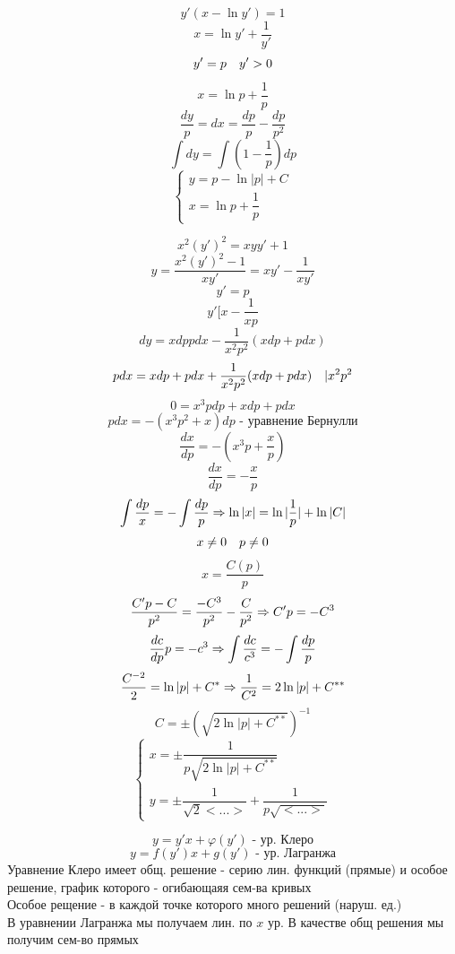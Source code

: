 \documentclass[12pt, fleqn]{article}
\begin{document}
\begin{Example}[267-286]
  \[y'(x-\ln y') = 1\]
  \[x = \ln y' + \dfrac{1}{y'}\]
  \[y' = p \quad y' > 0\]
  \[x = \ln p + \dfrac{1}{p}\]
  \[\dfrac{dy}{p} = dx = \dfrac{dp}{p} - \dfrac{dp}{p^2}\]
  \[\int dy = \int (1-\dfrac{1}{p}) dp\]
  \[\begin{cases}
    y = p - \ln |p| + C\\
    x = \ln p + \dfrac{1}{p}
  \end{cases}\]
\end{Example}

\begin{Example}[280]
  \[x^2 (y')^2 = xyy' + 1\]
  \[y = \dfrac{x^2 (y')^2 - 1}{x y'} = xy' - \dfrac{1}{xy'}\]
  \[y' = p\]
  \[y ' [x - \dfrac{1}{xp}\]
  \[dy = x dp p dx - \dfrac{1}{x^2 p^2} (x dp + p dx)\]
  \[p dx = x dp + p dx + \dfrac{1}{x^2 p^2} (x dp + p dx)\quad | x^2 p^2\]
  \[0 = x^3 p dp + x dp + p dx\]
  \[p dx = -(x^3 p^2 + x) dp \text{ - уравнение Бернулли}\]
  \[\dfrac{dx}{dp} = -(x^3 p + \dfrac{x}{p})\]
  \[\dfrac{dx}{dp} = - \dfrac{x}{p}\]
  \[\int \dfrac{dp}{x} = - \int \dfrac{dp}{p} \Rightarrow \ln |x| = \ln |\dfrac{1}{p}| + \ln|C|\]
  \[x \neq 0 \quad p \neq 0\]
  \[x = \dfrac{C(p)}{p}\]
  \[\dfrac{C'p - C}{p^2} = \dfrac{-C^3}{p^2} - \dfrac{C}{p^2} \Rightarrow C'p = - C^3\]
  \[\dfrac{dc}{dp} p = - c^3 \Rightarrow \int \dfrac{dc}{c^3} = - \int \dfrac{dp}{p}\]
  \[\dfrac{C^{-2}}{2} = \ln|p| + C^* \Rightarrow \dfrac{1}{C^2} = 2 \ln|p| + C^{**}\]
  \[C = \pm (\sqrt{2 \ln|p| + C^{**}})^{-1} \]
  \[\begin{cases}
    x = \pm \dfrac{1}{p\sqrt{2 \ln|p| + C^{**}}}\\
    y = \pm \dfrac{1}{\sqrt 2 <...>} + \dfrac{1}{p \sqrt{<...>}}
  \end{cases}\]
\end{Example}


\begin{Definition}
    \[y = y' x + \varphi(y') \text{ - ур. Клеро}\]
    \[y = f(y')x + g(y') \text{ - ур. Лагранжа}\]
    Уравнение Клеро имеет общ. решение - серию лин. функций (прямые) и особое решение, график которого - 
    огибающаяя сем-ва кривых\\
    Особое рещение - в каждой точке которого много решений (наруш. ед.)\\
    В уравнении Лагранжа мы получаем лин. по $x$ ур. В качестве общ решения мы получим сем-во прямых
\end{Definition}
\end{document}
